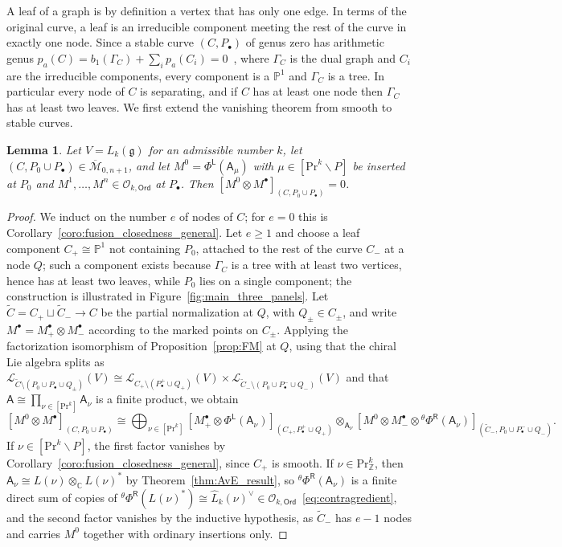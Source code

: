 \documentclass[12pt,a4paper,reqno]{amsart}
\numberwithin{equation}{section}
\newtheorem{lemma}[theorem]{Lemma}
\theoremstyle{definition}
\newcommand{\g}{\mathfrak{g}}
\newcommand{\C}{\mathbb{C}}
\newcommand{\Z}{\mathbb{Z}}
\renewcommand{\P}{\mathbb{P}}
\newcommand{\M}{\mathcal{M}}
\newcommand{\LL}{\mathcal{L}}
\def\O{\mathcal{O}}
\def\Ord{\mathsf{Ord}}
\def\L{\mathsf{L}}
\def\R{\mathsf{R}}
\def\Pr{\mathrm{Pr}}
\def\bs{\backslash}
\def\o{\otimes}
\def\A{\mathsf{A}}
\begin{document}
A leaf of a graph is by definition a vertex that has only one edge. In terms of the original curve, a leaf is an irreducible component meeting the rest of the curve in exactly one node.
Since a stable curve $(C,P_\bullet)$ of genus zero has arithmetic genus $p_a(C)=b_1(\Gamma_C)+\sum_i p_a(C_i)=0$~\cite[Chapter X, Section 2]{arbarello2011geometry}, where $\Gamma_C$ is the dual graph and $C_i$ are the irreducible components, every component is a $\P^1$ and $\Gamma_C$ is a tree. In particular every node of $C$ is separating, and if $C$ has at least one node then $\Gamma_C$ has at least two leaves. We first extend the vanishing theorem from smooth to stable curves.

\begin{lemma}\label{lm:nodal_vanishing}
Let $V=L_k(\g)$ for an admissible number $k$, let $(C,P_0\cup P_\bullet)\in\overline{\M}_{0,n+1}$, and let $M^0=\Phi^\L(\A_\mu)$ with $\mu\in[\Pr^k\bs P]$ be inserted at $P_0$ and $M^1,\dots,M^n\in\O_{k,\Ord}$ at $P_\bullet$. Then $[M^0\o M^\bullet]_{(C,P_0\cup P_\bullet)}=0$.
\end{lemma}
\begin{proof}
We induct on the number $e$ of nodes of $C$; for $e=0$ this is Corollary~\ref{coro:fusion_closedness_general}. Let $e\geq 1$ and choose a leaf component $C_+\cong\P^1$ not containing $P_0$, attached to the rest of the curve $C_-$ at a node $Q$; such a component exists because $\Gamma_C$ is a tree with at least two vertices, hence has at least two leaves, while $P_0$ lies on a single component; the construction is illustrated in Figure~\ref{fig:main_three_panels}. Let $\tilde{C}=C_+\sqcup\tilde{C}_-\to C$ be the partial normalization at $Q$, with $Q_\pm\in C_\pm$, and write $M^\bullet=M_+^\bullet\o M_-^\bullet$ according to the marked points on $C_\pm$. Applying the factorization isomorphism of Proposition~\ref{prop:FM} at $Q$, using that the chiral Lie algebra splits as $\LL_{\tilde{C}\setminus (P_0\cup P_\bullet\cup Q_\pm)}(V)\cong \LL_{C_+\setminus (P^+_\bullet\cup Q_+)}(V)\times \LL_{\tilde{C}_-\setminus (P_0\cup P^-_\bullet\cup Q_-)}(V)$ and that $\A\cong\prod_{\nu\in[\Pr^k]}\A_\nu$ is a finite product, we obtain
\begin{equation}\label{eq:leaf_split}
    [M^0\o M^\bullet]_{(C,P_0\cup P_\bullet)} \cong \bigoplus_{\nu \in [\Pr^k]} [M_+^\bullet \otimes \Phi^\L(\A_\nu)]_{(C_+,P_\bullet^+\cup Q_+)} \otimes_{\A_\nu} [M^0  \otimes M_-^\bullet  \otimes {}^\theta\Phi^\R(\A_\nu)]_{(\tilde{C}_-,P_0 \cup P_\bullet^-\cup Q_-)}.
\end{equation}
If $\nu\in[\Pr^k\bs P]$, the first factor vanishes by Corollary~\ref{coro:fusion_closedness_general}, since $C_+$ is smooth. If $\nu\in\Pr^k_\Z$, then $\A_\nu\cong L(\nu)\o_\C L(\nu)^\ast$ by Theorem~\ref{thm:AvE_result}, so ${}^\theta\Phi^\R(\A_\nu)$ is a finite direct sum of copies of ${}^\theta\Phi^\R(L(\nu)^\ast)\cong\hat{L}_k(\nu)^\vee\in\O_{k,\Ord}$~\eqref{eq:contragredient}, and the second factor vanishes by the inductive hypothesis, as $\tilde{C}_-$ has $e-1$ nodes and carries $M^0$ together with ordinary insertions only.
\end{proof}
\end{document}
